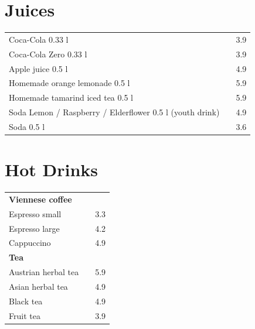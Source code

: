 \documentclass[a4paper,12pt]{article}
\begin{document}
\begin{multicols}{2}

\section*{Juices}
\begin{tabular}{Lrr}
Coca-Cola 0.33 l & & 3.9\\
Coca-Cola Zero 0.33 l & & 3.9\\
Apple juice 0.5 l & & 4.9\\
Homemade orange lemonade 0.5 l & & 5.9\\
Homemade tamarind iced tea 0.5 l & & 5.9\\
Soda Lemon / Raspberry / Elderflower 0.5 l (youth drink) & & 4.9\\
Soda 0.5 l & & 3.6
\end{tabular}

\section*{Hot Drinks}
\begin{tabular}{Lrr}
\textbf{Viennese coffee}\\
\hspace{0.4cm}Espresso small & & 3.3\\
\hspace{0.4cm}Espresso large & & 4.2\\
\hspace{0.4cm}Cappuccino & & 4.9\vspace{0.1cm}\\
\textbf{Tea}\\
\hspace{0.4cm}Austrian herbal tea & & 5.9\\
\hspace{0.4cm}Asian herbal tea & & 4.9\\
\hspace{0.4cm}Black tea & & 4.9\\
\hspace{0.4cm}Fruit tea & & 3.9
\end{tabular}


\end{multicols}
\end{document}
